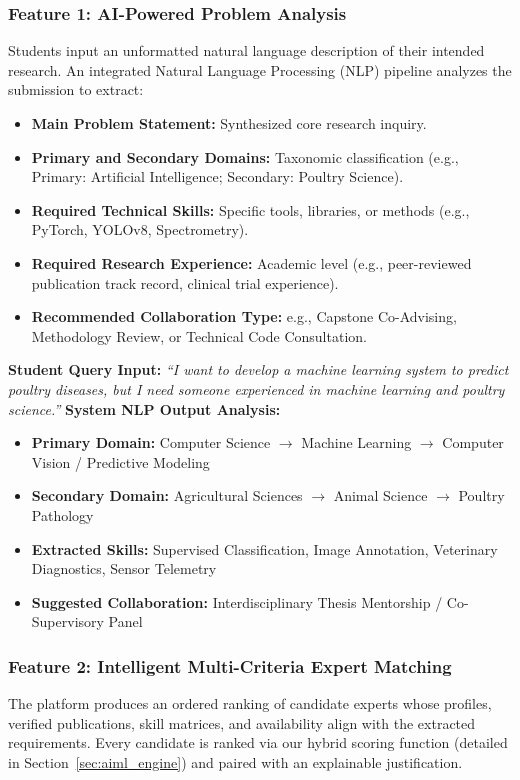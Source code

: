 \documentclass[11pt,a4paper]{article}
\begin{document}
\subsubsection{Feature 1: AI-Powered Problem Analysis}
Students input an unformatted natural language description of their intended research. An integrated Natural Language Processing (NLP) pipeline analyzes the submission to extract:
\begin{itemize}
    \item \textbf{Main Problem Statement:} Synthesized core research inquiry.
    \item \textbf{Primary and Secondary Domains:} Taxonomic classification (e.g., Primary: Artificial Intelligence; Secondary: Poultry Science).
    \item \textbf{Required Technical Skills:} Specific tools, libraries, or methods (e.g., PyTorch, YOLOv8, Spectrometry).
    \item \textbf{Required Research Experience:} Academic level (e.g., peer-reviewed publication track record, clinical trial experience).
    \item \textbf{Recommended Collaboration Type:} e.g., Capstone Co-Advising, Methodology Review, or Technical Code Consultation.
\end{itemize}

\begin{examplebox}
\textbf{Student Query Input:} \textit{``I want to develop a machine learning system to predict poultry diseases, but I need someone experienced in machine learning and poultry science.''}
\tcblower
\textbf{System NLP Output Analysis:}
\begin{itemize}
    \item \textbf{Primary Domain:} Computer Science $\rightarrow$ Machine Learning $\rightarrow$ Computer Vision / Predictive Modeling
    \item \textbf{Secondary Domain:} Agricultural Sciences $\rightarrow$ Animal Science $\rightarrow$ Poultry Pathology
    \item \textbf{Extracted Skills:} Supervised Classification, Image Annotation, Veterinary Diagnostics, Sensor Telemetry
    \item \textbf{Suggested Collaboration:} Interdisciplinary Thesis Mentorship / Co-Supervisory Panel
\end{itemize}
\end{examplebox}

\subsubsection{Feature 2: Intelligent Multi-Criteria Expert Matching}
The platform produces an ordered ranking of candidate experts whose profiles, verified publications, skill matrices, and availability align with the extracted requirements. Every candidate is ranked via our hybrid scoring function (detailed in Section~\ref{sec:aiml_engine}) and paired with an explainable justification.
\end{document}
